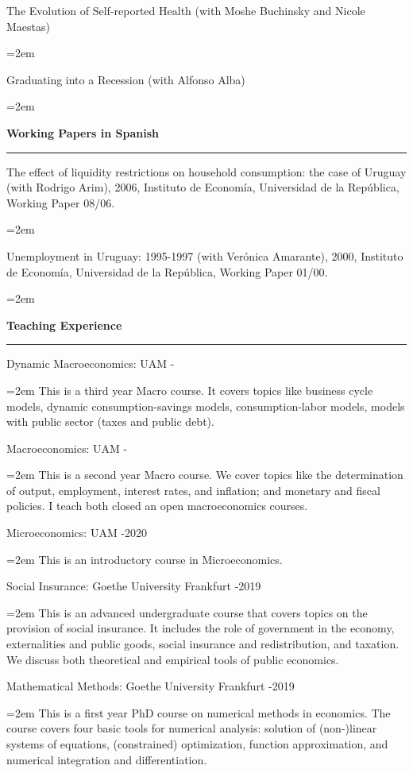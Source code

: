 \documentclass[12pt]{article}
\newcommand{\sepspace}{\vspace*{1em}}		%
\newcommand{\NewPart}[1]{ \vspace*{0.4cm} \noindent \large \textbf{#1}
\par \normalsize \normalfont \vspace*{-0.5cm} \noindent\rule{\textwidth}{1.8pt} \vspace*{-0.75cm} }
\newcommand{\EducationEntry}[4]{
		\noindent #1 \hfill      %
		\noindent #2 %
		\noindent \textit{#3} \par        %
		\noindent\hangindent=2em\hangafter=0  #4 %
		\normalsize \par}
\begin{document}
\EducationEntry{The Evolution of Self-reported Health (with Moshe Buchinsky and Nicole Maestas)}{}{}{}


\vspace*{-0.25cm}

\EducationEntry{Graduating into a Recession (with Alfonso Alba)}{}{}{}



\vspace*{-0.25cm}
\NewPart{Working Papers in Spanish}{}

\EducationEntry{The effect of liquidity restrictions on household consumption: the case of Uruguay (with Rodrigo Arim), 2006, Instituto de Economía, Universidad de la República, Working Paper 08/06.}{}{}{}
\vspace*{-0.5cm}
\EducationEntry{Unemployment in Uruguay: 1995-1997 (with Verónica Amarante), 2000, Instituto de Economía, Universidad de la República, Working Paper 01/00.}{}{}{}

\vspace*{-0.2cm}
\NewPart{Teaching Experience}{}

\EducationEntry{Dynamic Macroeconomics: UAM}{2021-}{}{This is a third year Macro course. It covers topics like business cycle models, dynamic consumption-savings models, consumption-labor models, models with public sector (taxes and public debt).}

\EducationEntry{Macroeconomics: UAM}{2020-}{}{This is a second year Macro course. We cover topics like the determination of output, employment, interest rates, and inflation; and monetary and fiscal policies. I teach both closed an open macroeconomics courses.}

\EducationEntry{Microeconomics: UAM}{2019-2020}{}{This is an introductory course in Microeconomics.}

\EducationEntry{Social Insurance: Goethe University Frankfurt}{2018-2019}{}{This is an advanced undergraduate course that covers topics on the provision of social insurance. It includes the role of government in the economy, externalities and public goods, social insurance and redistribution, and taxation. We discuss both theoretical and empirical tools of public economics.}

\EducationEntry{Mathematical Methods: Goethe University Frankfurt}{2018-2019}{}{This is a first year PhD course on numerical methods in economics. The course covers four basic tools for numerical analysis: solution of (non-)linear systems of equations, (constrained) optimization, function approximation, and numerical integration and differentiation. }
\end{document}
